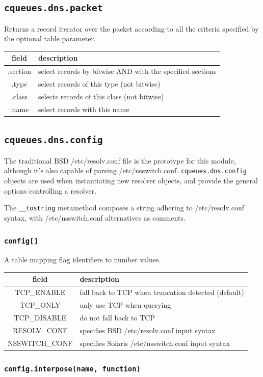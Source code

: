 \documentclass[11pt, oneside]{memoir}
\newcommand*{\fn}[1]{\texttt{#1}\xspace}
\newcommand*{\module}[1]{\texttt{#1}\xspace}
\newcounter{toccols}
\newenvironment{Module}[1]{
	\subsection{\texttt{#1}}
	\addtocontents{toc}{
		\protect\begin{multicols}{\value{toccols}}
	}
}{
	\addtocontents{toc}{\protect\end{multicols}}
}
\begin{document}
\begin{Module}{cqueues.dns.packet}
Returns a record iterator over the packet according to all the criteria specified by the optional table parameter.

\begin{tabular}{ c | l }
field & description\\\hline
.section & select records by bitwise AND with the specified sections\\
.type & select records of this type (not bitwise)\\
.class & selects records of this class (not bitwise)\\
.name & select records with this name
\end{tabular}

\end{Module}


\begin{Module}{cqueues.dns.config}

The traditional BSD /etc/resolv.conf file is the prototype for this module, although it's also capable of parsing /etc/nsswitch.conf. \module{cqueues.dns.config} objects are used when instantiating new resolver objects, and provide the general options controlling a resolver.

The \fn{\_\_tostring} metamethod composes a string adhering to /etc/resolv.conf syntax, with /etc/nsswitch.conf alternatives as comments.

\subsubsection[\fn{config[]}]{\fn{config[]}}

A table mapping flag identifiers to number values.

\begin{tabular}{ c | l }
field & description\\\hline
TCP\_ENABLE & fall back to TCP when truncation detected (default)\\
TCP\_ONLY & only use TCP when querying\\
TCP\_DISABLE & do not fall back to TCP\\
RESOLV\_CONF & specifies BSD /etc/resolv.conf input syntax\\
NSSWITCH\_CONF & specifies Solaris /etc/nsswitch.conf input syntax
\end{tabular}

\subsubsection[\fn{config.interpose}]{\fn{config.interpose(name, function)}}


\end{Module}
\end{document}
